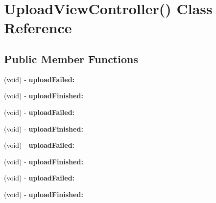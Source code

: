 \hypertarget{interface_upload_view_controller_07_08}{
\section{\-Upload\-View\-Controller() \-Class \-Reference}
\label{interface_upload_view_controller_07_08}
}
\subsection*{\-Public \-Member \-Functions}
\begin{DoxyCompactItemize}
\item 
\hypertarget{interface_upload_view_controller_07_08_ab3fff7cf143325f4ac2009f1681d9e1a}{
(void) -\/ {\bfseries upload\-Failed\-:}}
\label{interface_upload_view_controller_07_08_ab3fff7cf143325f4ac2009f1681d9e1a}

\item 
\hypertarget{interface_upload_view_controller_07_08_a1e66e7a2b8634d8bbe570a5720b5d7d8}{
(void) -\/ {\bfseries upload\-Finished\-:}}
\label{interface_upload_view_controller_07_08_a1e66e7a2b8634d8bbe570a5720b5d7d8}

\item 
\hypertarget{interface_upload_view_controller_07_08_ab3fff7cf143325f4ac2009f1681d9e1a}{
(void) -\/ {\bfseries upload\-Failed\-:}}
\label{interface_upload_view_controller_07_08_ab3fff7cf143325f4ac2009f1681d9e1a}

\item 
\hypertarget{interface_upload_view_controller_07_08_a1e66e7a2b8634d8bbe570a5720b5d7d8}{
(void) -\/ {\bfseries upload\-Finished\-:}}
\label{interface_upload_view_controller_07_08_a1e66e7a2b8634d8bbe570a5720b5d7d8}

\item 
\hypertarget{interface_upload_view_controller_07_08_ab3fff7cf143325f4ac2009f1681d9e1a}{
(void) -\/ {\bfseries upload\-Failed\-:}}
\label{interface_upload_view_controller_07_08_ab3fff7cf143325f4ac2009f1681d9e1a}

\item 
\hypertarget{interface_upload_view_controller_07_08_a1e66e7a2b8634d8bbe570a5720b5d7d8}{
(void) -\/ {\bfseries upload\-Finished\-:}}
\label{interface_upload_view_controller_07_08_a1e66e7a2b8634d8bbe570a5720b5d7d8}

\item 
\hypertarget{interface_upload_view_controller_07_08_ab3fff7cf143325f4ac2009f1681d9e1a}{
(void) -\/ {\bfseries upload\-Failed\-:}}
\label{interface_upload_view_controller_07_08_ab3fff7cf143325f4ac2009f1681d9e1a}

\item 
\hypertarget{interface_upload_view_controller_07_08_a1e66e7a2b8634d8bbe570a5720b5d7d8}{
(void) -\/ {\bfseries upload\-Finished\-:}}
\label{interface_upload_view_controller_07_08_a1e66e7a2b8634d8bbe570a5720b5d7d8}

\end{DoxyCompactItemize}


